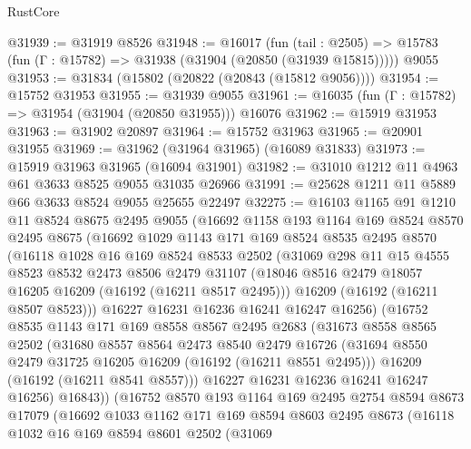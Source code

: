 \begin{lexlean}{RustCore}
\begin{coremodule}
@31939 := @31919 @8526
@31948 := @16017
    (fun (tail : @2505) => @15783 (fun (Γ : @15782) => @31938 (@31904 (@20850 (@31939 @15815)))))
    @9055
@31953 := @31834 (@15802 (@20822 (@20843 (@15812 @9056))))
@31954 := @15752 @31953
@31955 := @31939 @9055
@31961 := @16035 (fun (Γ : @15782) => @31954 (@31904 (@20850 @31955))) @16076
@31962 := @15919 @31953
@31963 := @31902 @20897
@31964 := @15752 @31963
@31965 := @20901 @31955
@31969 := @31962 (@31964 @31965) (@16089 @31833)
@31973 := @15919 @31963 @31965 (@16094 @31901)
@31982 := @31010 @1212 @11 @4963 @61 @3633 @8525 @9055 @31035 @26966
@31991 := @25628 @1211 @11 @5889 @66 @3633 @8524 @9055 @25655 @22497
@32275 := @16103
    @1165
    @91
    @1210
    @11
    @8524
    @8675
    @2495
    @9055
    (@16692
      @1158
      @193
      @1164
      @169
      @8524
      @8570
      @2495
      @8675
      (@16692
        @1029
        @1143
        @171
        @169
        @8524
        @8535
        @2495
        @8570
        (@16118
          @1028
          @16
          @169
          @8524
          @8533
          @2502
          (@31069
            @298
            @11
            @15
            @4555
            @8523
            @8532
            @2473
            @8506
            @2479
            @31107
            (@18046 @8516 @2479 @18057 @16205 @16209 (@16192 (@16211 @8517 @2495)))
            @16209
            (@16192 (@16211 @8507 @8523)))
          @16227
          @16231
          @16236
          @16241
          @16247
          @16256)
        (@16752
          @8535
          @1143
          @171
          @169
          @8558
          @8567
          @2495
          @2683
          (@31673
            @8558
            @8565
            @2502
            (@31680
              @8557
              @8564
              @2473
              @8540
              @2479
              @16726
              (@31694 @8550 @2479 @31725 @16205 @16209 (@16192 (@16211 @8551 @2495)))
              @16209
              (@16192 (@16211 @8541 @8557)))
            @16227
            @16231
            @16236
            @16241
            @16247
            @16256)
          @16843))
      (@16752
        @8570
        @193
        @1164
        @169
        @2495
        @2754
        @8594
        @8673
        @17079
        (@16692
          @1033
          @1162
          @171
          @169
          @8594
          @8603
          @2495
          @8673
          (@16118
            @1032
            @16
            @169
            @8594
            @8601
            @2502
            (@31069

\end{coremodule}
\end{lexlean}
